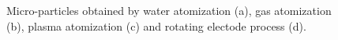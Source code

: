 \begin{figure}[H]
    \qquad
    
    \caption[Powders from atomization processes]{Micro-particles obtained by water atomization (a), gas atomization (b), plasma atomization (c) and rotating electode process (d).}
    \label{fig:powders}
\end{figure}



